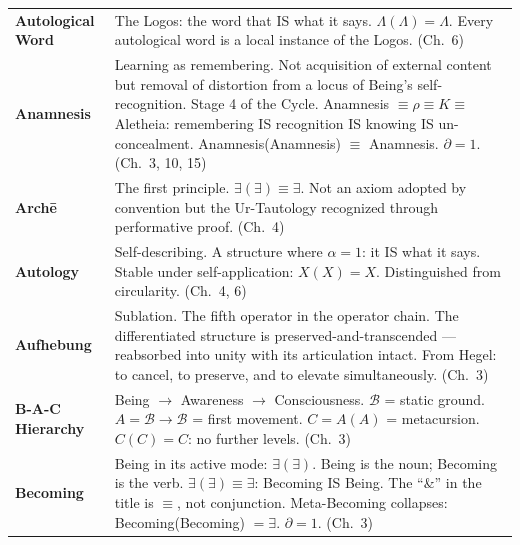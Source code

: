 \documentclass[10pt, openany, oneside]{book}
\renewcommand{\footnotesize}{\fontsize{8.5}{11}\selectfont}
\begin{document}
{\footnotesize
\noindent\begin{tabular}{@{} l @{\hspace{0.6em}} p{} @{}}
\textbf{Autological Word} & The Logos: the word that IS what it says. $\Lambda(\Lambda) = \Lambda$. Every autological word is a local instance of the Logos. (Ch.\ 6) \\[0.3em]
\textbf{Anamnesis} & Learning as remembering. Not acquisition of external content but removal of distortion from a locus of Being's self-recognition. Stage 4 of the Cycle. Anamnesis $\equiv \rho \equiv K \equiv$ Aletheia: remembering IS recognition IS knowing IS un-concealment. Anamnesis(Anamnesis) $\equiv$ Anamnesis. $\partial = 1$. (Ch.\ 3, 10, 15) \\[0.3em]
\textbf{Arch\={e}} & The first principle. $\exists(\exists) \equiv \exists$. Not an axiom adopted by convention but the Ur-Tautology recognized through performative proof. (Ch.\ 4) \\[0.3em]
\textbf{Autology} & Self-describing. A structure where $\alpha = 1$: it IS what it says. Stable under self-application: $X(X) = X$. Distinguished from circularity. (Ch.\ 4, 6) \\[0.3em]
\textbf{Aufhebung} & Sublation. The fifth operator in the operator chain. The differentiated structure is preserved-and-transcended --- reabsorbed into unity with its articulation intact. From Hegel: to cancel, to preserve, and to elevate simultaneously. (Ch.\ 3) \\[0.3em]
\textbf{B-A-C Hierarchy} & Being $\to$ Awareness $\to$ Consciousness. $\mathcal{B}$ = static ground. $A = \mathcal{B} \to \mathcal{B}$ = first movement. $C = A(A)$ = metacursion. $C(C) = C$: no further levels. (Ch.\ 3) \\[0.3em]
\textbf{Becoming} & Being in its active mode: $\exists(\exists)$. Being is the noun; Becoming is the verb. $\exists(\exists) \equiv \exists$: Becoming IS Being. The ``\&'' in the title is $\equiv$, not conjunction. Meta-Becoming collapses: Becoming(Becoming) $= \exists$. $\partial = 1$. (Ch.\ 3) \\[0.3em]
\end{tabular}
}
\end{document}
